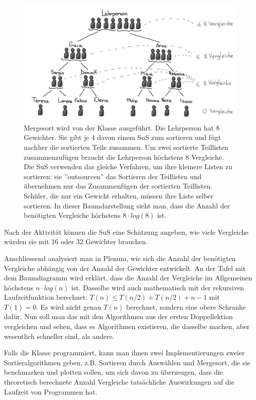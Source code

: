 \documentclass[
	12pt, %
	german, %
]{fphw}
\begin{document}
\begin{figure}[H]
	\centering
	\includegraphics[width=\textwidth]{Mergesort_Aktivitaet.png}
	\caption{Mergesort wird von der Klasse ausgeführt. Die Lehrperson hat 8 Gewichter. Sie gibt je 4 davon einem SuS zum sortieren und fügt nachher die sortierten Teile zusammen. Um zwei sortierte Teillisten zusammenzufügen braucht die Lehrperson höchstens 8 Vergleiche. Die SuS verwenden das gleiche Verfahren, um ihre kleinere Listen zu sortieren: sie ''outsourcen'' das Sortieren der Teillisten und übernehmen nur das Zusammenfügen der sortierten Teillisten. Schüler, die nur ein Gewicht erhalten, müssen ihre Liste selber sortieren. In dieser Baumdarstellung sieht man, dass die Anzahl der benötigten Vergleiche höchstens \(8 \cdot log(8)\) ist.}
\end{figure}

Nach der Aktivität können die SuS eine Schätzung angeben, wie viele Vergleiche würden sie mit 16 oder 32 Gewichter brauchen.

Anschliessend analysiert man in Plenum, wie sich die Anzahl der benötigten Vergleiche abhängig von der Anzahl der Gewichter entwickelt. An der Tafel mit dem Baumdiagramm wird erklärt, dass die Anzahl der Vergleiche im Allgemeinen höchstens \(n \cdot log(n)\) ist. Dasselbe wird auch mathematisch mit der rekursiven Laufzeitfunktion berechnet: \(T(n) \leq T(n/2) + T(n/2) + n - 1\) mit \(T(1) = 0\). Es wird nicht genau \(T(n)\) berechnet, sondern eine obere Schranke dafür. Nun soll man das mit den Algorithmen aus der ersten Doppellektion vergleichen und sehen, dass es Algorithmen existieren, die dasselbe machen, aber wesentlich schneller sind, als andere.

Falls die Klasse programmiert, kann man ihnen zwei Implementierungen zweier Sortieralgorithmen geben, z.B. Sortieren durch Auswählen und Mergesort, die sie benchmarken und plotten sollen, um sich davon zu überzeugen, dass die theoretisch berechnete Anzahl Vergleiche tatsächliche Auswirkungen auf die Laufzeit von Programmen hat.
\end{document}
